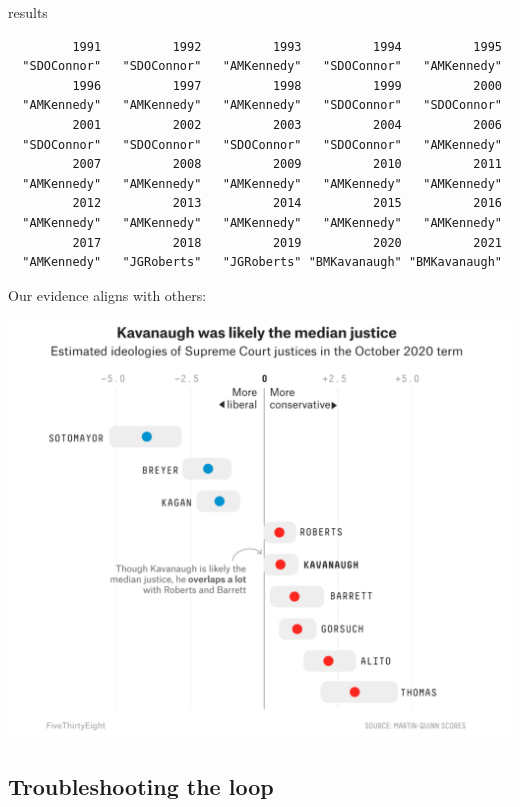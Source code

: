 \documentclass[
  letterpaper,
  DIV=11,
  numbers=noendperiod]{scrreprt}
\newenvironment{Shaded}{\begin{snugshade}}{\end{snugshade}}
\newcommand{\NormalTok}[1]{\textcolor[rgb]{0.00,0.23,0.31}{#1}}
\begin{document}
\begin{Shaded}
\begin{Highlighting}[]
\NormalTok{results}
\end{Highlighting}
\end{Shaded}

\begin{verbatim}
         1991          1992          1993          1994          1995 
  "SDOConnor"   "SDOConnor"   "AMKennedy"   "SDOConnor"   "AMKennedy" 
         1996          1997          1998          1999          2000 
  "AMKennedy"   "AMKennedy"   "AMKennedy"   "SDOConnor"   "SDOConnor" 
         2001          2002          2003          2004          2006 
  "SDOConnor"   "SDOConnor"   "SDOConnor"   "SDOConnor"   "AMKennedy" 
         2007          2008          2009          2010          2011 
  "AMKennedy"   "AMKennedy"   "AMKennedy"   "AMKennedy"   "AMKennedy" 
         2012          2013          2014          2015          2016 
  "AMKennedy"   "AMKennedy"   "AMKennedy"   "AMKennedy"   "AMKennedy" 
         2017          2018          2019          2020          2021 
  "AMKennedy"   "JGRoberts"   "JGRoberts" "BMKavanaugh" "BMKavanaugh" 
\end{verbatim}

Our evidence aligns with others:

\includegraphics{images/sccourt2.png}

\hypertarget{troubleshooting-the-loop}{%
\subsection{Troubleshooting the loop}\label{troubleshooting-the-loop}}
\end{document}
